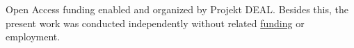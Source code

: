 \documentclass[conference]{IEEEtran}
\begin{document}
Open Access funding enabled and organized by Projekt DEAL. %
Besides this, the present work was conducted independently without related \href{https://ko-fi.com/michaelhoss}{funding} or employment. 

%
% 
% 
% 
% 
% 


{\small


}
\end{document}
